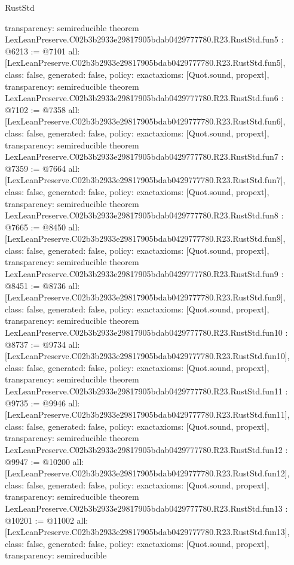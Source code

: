 \begin{lexlean}{RustStd}
\begin{coremodule}
{  transparency: semireducible
}
theorem LexLeanPreserve.C02b3b2933e29817905bdab0429777780.R23.RustStd.fun5 : @6213 := @7101 {
  all: [LexLeanPreserve.C02b3b2933e29817905bdab0429777780.R23.RustStd.fun5],
  class: false,
  generated: false,
  policy: exact{axioms: [Quot.sound, propext]},
  transparency: semireducible
}
theorem LexLeanPreserve.C02b3b2933e29817905bdab0429777780.R23.RustStd.fun6 : @7102 := @7358 {
  all: [LexLeanPreserve.C02b3b2933e29817905bdab0429777780.R23.RustStd.fun6],
  class: false,
  generated: false,
  policy: exact{axioms: [Quot.sound, propext]},
  transparency: semireducible
}
theorem LexLeanPreserve.C02b3b2933e29817905bdab0429777780.R23.RustStd.fun7 : @7359 := @7664 {
  all: [LexLeanPreserve.C02b3b2933e29817905bdab0429777780.R23.RustStd.fun7],
  class: false,
  generated: false,
  policy: exact{axioms: [Quot.sound, propext]},
  transparency: semireducible
}
theorem LexLeanPreserve.C02b3b2933e29817905bdab0429777780.R23.RustStd.fun8 : @7665 := @8450 {
  all: [LexLeanPreserve.C02b3b2933e29817905bdab0429777780.R23.RustStd.fun8],
  class: false,
  generated: false,
  policy: exact{axioms: [Quot.sound, propext]},
  transparency: semireducible
}
theorem LexLeanPreserve.C02b3b2933e29817905bdab0429777780.R23.RustStd.fun9 : @8451 := @8736 {
  all: [LexLeanPreserve.C02b3b2933e29817905bdab0429777780.R23.RustStd.fun9],
  class: false,
  generated: false,
  policy: exact{axioms: [Quot.sound, propext]},
  transparency: semireducible
}
theorem LexLeanPreserve.C02b3b2933e29817905bdab0429777780.R23.RustStd.fun10 : @8737 := @9734 {
  all: [LexLeanPreserve.C02b3b2933e29817905bdab0429777780.R23.RustStd.fun10],
  class: false,
  generated: false,
  policy: exact{axioms: [Quot.sound, propext]},
  transparency: semireducible
}
theorem LexLeanPreserve.C02b3b2933e29817905bdab0429777780.R23.RustStd.fun11 : @9735 := @9946 {
  all: [LexLeanPreserve.C02b3b2933e29817905bdab0429777780.R23.RustStd.fun11],
  class: false,
  generated: false,
  policy: exact{axioms: [Quot.sound, propext]},
  transparency: semireducible
}
theorem LexLeanPreserve.C02b3b2933e29817905bdab0429777780.R23.RustStd.fun12 : @9947 := @10200 {
  all: [LexLeanPreserve.C02b3b2933e29817905bdab0429777780.R23.RustStd.fun12],
  class: false,
  generated: false,
  policy: exact{axioms: [Quot.sound, propext]},
  transparency: semireducible
}
theorem LexLeanPreserve.C02b3b2933e29817905bdab0429777780.R23.RustStd.fun13 : @10201 := @11002 {
  all: [LexLeanPreserve.C02b3b2933e29817905bdab0429777780.R23.RustStd.fun13],
  class: false,
  generated: false,
  policy: exact{axioms: [Quot.sound, propext]},
  transparency: semireducible
}
\end{coremodule}
\end{lexlean}
